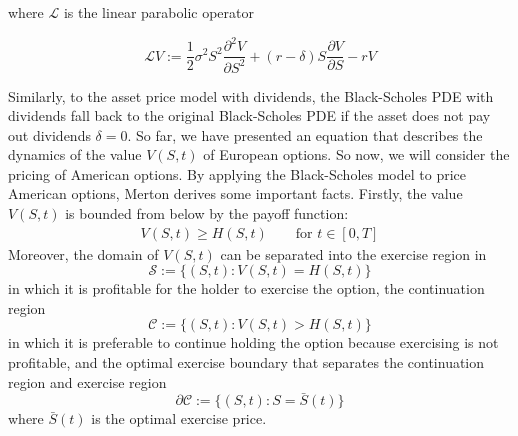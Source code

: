 where $\mathcal{L}$ is the linear parabolic operator

\begin{equation}
  \mathcal{L}V := \dfrac{1}{2}\sigma^{2} S^2 \dfrac{\partial^2{V}}{\partial{S^2}} + (r - \delta) S \dfrac{\partial{V}}{\partial{S}} - rV
  \label{eq:blackscholes:preliminaries:linear_parabolic_operator}
\end{equation}

Similarly, to the asset price model with dividends, the Black-Scholes PDE
with dividends fall back to the original Black-Scholes PDE if the asset does not pay out dividends $\delta = 0$. So far, we have presented an equation that
describes the dynamics of the value $V(S,t)$ of European options. So now, we will consider the pricing of American options. By applying the Black-Scholes model to price American options, Merton \cite*{merton_1973} derives some important facts. Firstly, the value $V(S,t)$ is bounded from below by the payoff function:
\begin{align*}
  V(S, t) \ge H(S, t) \qquad \text{for $t \in [0, T]$}
  \label{eq:blackscholes:american_options_price_lower_bound}
\end{align*}
Moreover, the domain of $V(S, t)$ can be separated into the exercise region in 
\begin{equation*}
  \mathcal{S} := \{(S, t) : V(S, t) = H(S, t)\}
  \label{eq:blackscholes:preliminaries:exercise_region}
\end{equation*}
in which it is profitable for the holder to exercise the option, the continuation region
\begin{equation*}
  \mathcal{C} := \{(S, t) : V(S, t) > H(S, t)\}
\end{equation*} 
in which it is preferable to continue holding the option because exercising is not profitable, and the optimal exercise boundary that separates the continuation region and exercise region
\begin{equation*}
  \partial \mathcal{C} := \{(S, t) : S = \bar{S}(t)\}
  \label{eq:blackscholes:preliminaries:continuation_region}
\end{equation*}
where $\bar{S}(t)$ is the optimal exercise price. 
